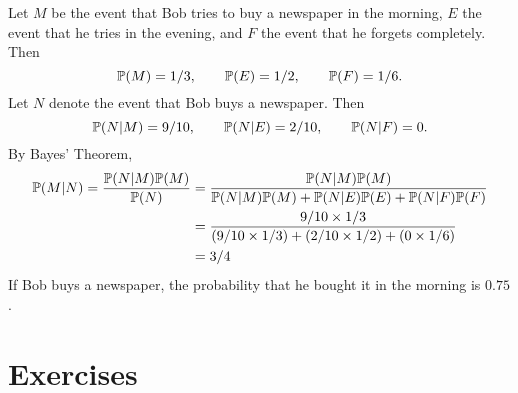 \begin{solution}
Let $M$ be the event that Bob tries to buy a newspaper in the morning, $E$ the event that he tries in the evening, and $F$ the event that he forgets completely. Then
\[
\mathbb{P}(M) = 1/3, \qquad \mathbb{P}(E) = 1/2, \qquad \mathbb{P}(F) = 1/6.
\]
Let $N$ denote the event that Bob buys a newspaper. Then
\[
\mathbb{P}(N|M) = 9/10, \qquad \mathbb{P}(N|E) = 2/10, \qquad \mathbb{P}(N|F) = 0.
\]
By Bayes' Theorem,
\begin{align*}
\mathbb{P}(M|N) = \frac{\mathbb{P}(N|M)\mathbb{P}(M)}{\mathbb{P}(N)}
	& = \frac{\mathbb{P}(N|M)\mathbb{P}(M)}{\mathbb{P}(N|M)\mathbb{P}(M) + \mathbb{P}(N|E)\mathbb{P}(E) + \mathbb{P}(N|F)\mathbb{P}(F)} \\
	& = \frac{9/10\times 1/3}{(9/10\times 1/3) + (2/10\times 1/2) + (0\times 1/6)} \\
	& = 3/4
\end{align*}
If Bob buys a newspaper, the probability that he bought it in the morning is $0.75$.
\end{solution}



\section{Exercises}


\endinput
